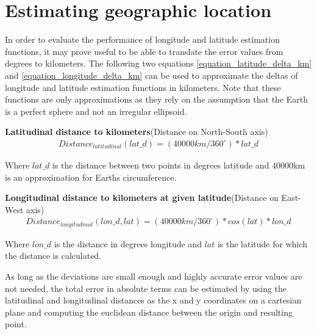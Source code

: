 \chapter{Estimating geographic location}
\label{chapter_est_geoloc}
In order to evaluate the performance of longitude and latitude estimation functions, it may prove useful to be able to translate the error values from degrees to kilometers. The following two equations \ref{equation_latitude_delta_km} and \ref{equation_longitude_delta_km} can be used to approximate the deltas of longitude and latitude estimation functions in kilometers. Note that these functions are only approximations as they rely on the assumption that the Earth is a perfect sphere and not an irregular ellipsoid.


\hfill \break
\noindent\textbf{Latitudinal distance to kilometers}(Distance on North-South axis)
%
\begin{equation}
\begin{split}
\label{equation_latitude_delta_km}
Distance_{latitudinal}(lat\_d)=(40 000km/360^\circ)* lat\_d
\end{split}
\end{equation}

\noindent Where $lat\_d$ is the distance between two points in degrees latitude and 40000km is an approximation for Earths circumference.

\vspace{5mm} %

\noindent\textbf{Longitudinal distance to kilometers at given latitude}(Distance on East-West axis)
%
\begin{equation}
\begin{split}
\label{equation_longitude_delta_km}
Distance_{longitudinal}(lon\_d, lat)=(40 000km/360^\circ)* cos(lat)*lon\_d
\end{split}
\end{equation}

\noindent Where $lon\_d$ is the distance in degrees longitude and $lat$ is the latitude for which the distance is calculated.



\vspace{5mm} %

\noindent As long as the deviations are small enough and highly accurate error values are not needed, the total error in absolute terms can be estimated by using the latitudinal and longitudinal distances as the x and y coordinates on a cartesian plane and computing the euclidean distance between the origin and resulting point.

